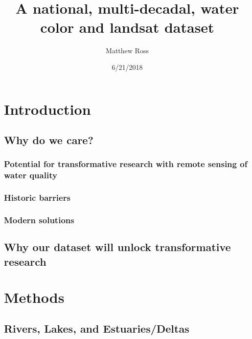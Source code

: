 \documentclass[]{article}
\title{A national, multi-decadal, water color and landsat dataset}
\author{Matthew Ross}
\date{6/21/2018}
\begin{document}
\maketitle

{
\setcounter{tocdepth}{2}
\tableofcontents
}
\hypertarget{introduction}{%
\section{Introduction}\label{introduction}}

\hypertarget{why-do-we-care}{%
\subsection{Why do we care?}\label{why-do-we-care}}

\hypertarget{potential-for-transformative-research-with-remote-sensing-of-water-quality}{%
\subsubsection{Potential for transformative research with remote sensing
of water
quality}\label{potential-for-transformative-research-with-remote-sensing-of-water-quality}}

\hypertarget{historic-barriers}{%
\subsubsection{Historic barriers}\label{historic-barriers}}

\hypertarget{modern-solutions}{%
\subsubsection{Modern solutions}\label{modern-solutions}}

\hypertarget{why-our-dataset-will-unlock-transformative-research}{%
\subsection{Why our dataset will unlock transformative
research}\label{why-our-dataset-will-unlock-transformative-research}}

\hypertarget{methods}{%
\section{Methods}\label{methods}}

\hypertarget{rivers-lakes-and-estuariesdeltas}{%
\subsection{Rivers, Lakes, and
Estuaries/Deltas}\label{rivers-lakes-and-estuariesdeltas}}
\end{document}
